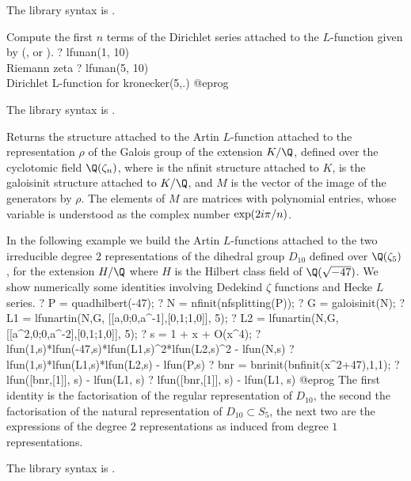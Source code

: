 The library syntax is .

\label{se:lfunan}
Compute the first $n$ terms of the Dirichlet series attached to the
 $L$-function given by  (,  or ).
 \bprog
 ? lfunan(1, 10)  \\ Riemann zeta
 ? lfunan(5, 10)  \\ Dirichlet L-function for kronecker(5,.)
 @eprog

The library syntax is .

\label{se:lfunartin}
Returns the  structure attached to the
Artin $L$-function attached to the representation $\rho$ of the Galois group
of the extension $K/\Q$, defined over the cyclotomic field $\Q(\zeta_n)$,
where  is the nfinit structure attached to $K$,
 is the galoisinit structure attached to $K/\Q$, and $M$ is
the vector of the image of the generators  by $\rho$.
The elements of $M$ are matrices with polynomial entries, whose variable
is understood as the complex number $\exp(2\*i\*\pi/n)$.

In the following example we build the Artin $L$-functions attached to the two
irreducible degree $2$ representations of the dihedral group $D_{10}$ defined
over $\Q(\zeta_5)$, for the extension $H/\Q$ where $H$ is the Hilbert class
field of $\Q(\sqrt{-47})$.
We show numerically some identities involving Dedekind $\zeta$ functions and
Hecke $L$ series.
\bprog
? P = quadhilbert(-47);
? N = nfinit(nfsplitting(P));
? G = galoisinit(N);
? L1 = lfunartin(N,G, [[a,0;0,a^-1],[0,1;1,0]], 5);
? L2 = lfunartin(N,G, [[a^2,0;0,a^-2],[0,1;1,0]], 5);
? s = 1 + x + O(x^4);
? lfun(1,s)*lfun(-47,s)*lfun(L1,s)^2*lfun(L2,s)^2 - lfun(N,s)
? lfun(1,s)*lfun(L1,s)*lfun(L2,s) - lfun(P,s)
? bnr = bnrinit(bnfinit(x^2+47),1,1);
? lfun([bnr,[1]], s) - lfun(L1, s)
? lfun([bnr,[1]], s) - lfun(L1, s)
@eprog
The first identity is the factorisation of the regular representation of
$D_{10}$, the second the factorisation of the natural representation of
$D_{10}\subset S_5$, the next two are the expressions of the degree $2$
representations as induced from degree $1$ representations.

The library syntax is .

